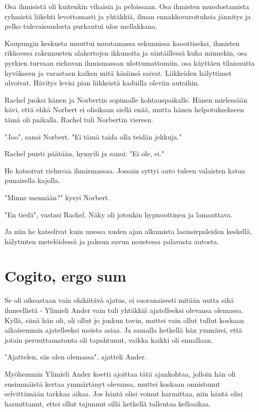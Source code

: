 Osa ihmisistä oli kuitenkin vihaisia ja peloissaan. Osa ihmisten muodostamista ryhmistä liikehti levottomasti ja yhtäkkiä, ilman ennakkovaroituksia jännitys ja pelko tulevaisuudesta purkautui ulos mellakkana.


Kaupungin keskusta muuttui muutamassa sekunnissa kaoottiseksi, ihmisten rikkoessa rakennusten alakertojen ikkunoita ja säntäillessä kuka minnekin, osa pyrkien turvaan riehuvan ihmismassan ulottumattomiin, osa käyttäen tilaisuutta hyväkseen ja varastaen kaiken mitä käsiinsä saivat. Liikkeiden hälyttimet ulvoivat. Hävitys levisi pian liikkeistä kaduilla oleviin autoihin.


Rachel juoksi hänen ja Norbertin sopimalle kohtauspaikalle. Hänen mielessään kävi, että ehkä Norbert ei olisikaan siellä enää, mutta hänen helpotuksekseen tämä oli paikalla. Rachel tuli Norbertin viereen.


"Joo", sanoi Norbert. "Ei tämä taida olla teidän jekkuja."


Rachel puisti päätään, hymyili ja sanoi: "Ei ole, ei."


He katsoivat riehuvaa ihmismassaa. Jossain syttyi auto tuleen valaisten katua punaisella kajolla.


"Minne mennään?" kysyi Norbert.


"En tiedä", vastasi Rachel. Näky oli jotenkin hypnoottinen ja lamauttava.


Ja niin he katselivat kuin unessa uuden ajan alkamista lasinsirpaleiden keskellä, hälytinten metelöidessä ja paksun savun noustessa palavasta autosta.






\chapter{Cogito, ergo sum}Se oli oikeastaan vain ohikiitävä ajatus, ei suoranaisesti mitään uutta eikä ihmeellistä - Ylimieli Ander vain tuli yhtäkkiä ajatelleeksi olevansa olemassa. Kyllä, siinä hän oli, oli ollut jo jonkun tovin, muttei vain ollut tullut koskaan aikaisemmin ajatelleeksi moista asiaa. Ja samalla hetkellä hän ymmärsi, että jotain peruuttamatonta oli tapahtunut, vaikka kaikki oli ennallaan.


"Ajattelen, siis olen olemassa", ajatteli Ander.


Myöhemmin Ylimieli Ander koetti ajoittaa tätä ajankohtaa, jolloin hän oli ensimmäistä kertaa ymmärtänyt olevansa, muttei koskaan onnistunut selvittämään tarkkaa aikaa. Jos häntä olisi voinut harmittaa, niin häntä olisi harmittanut, ettei ollut tajunnut sillä hetkellä tallentaa kelloaikaa.


